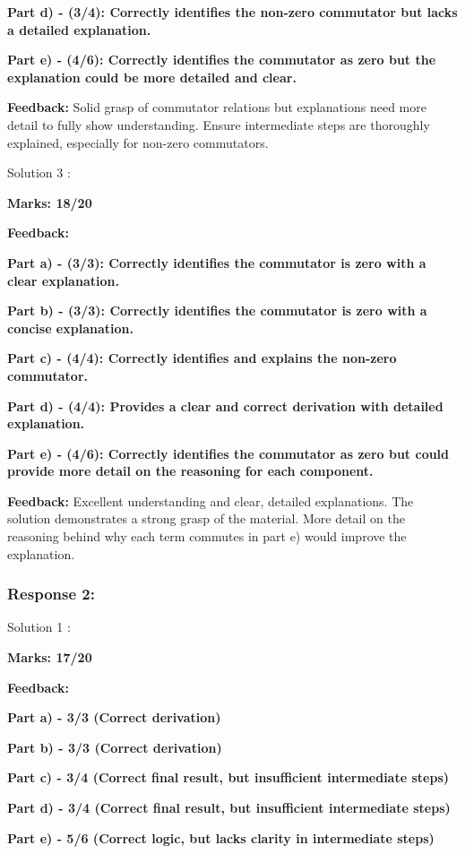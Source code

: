 \documentclass[a4paper,11pt]{article}
\begin{document}
\textbf{Part d) - (3/4): Correctly identifies the non-zero commutator but lacks a detailed explanation.}

\textbf{Part e) - (4/6): Correctly identifies the commutator as zero but the explanation could be more detailed and clear.}


\textbf{Feedback:}
Solid grasp of commutator relations but explanations need more detail to fully show understanding. Ensure intermediate steps are thoroughly explained, especially for non-zero commutators.


Solution 3 :

\textbf{Marks: 18/20}

\textbf{Feedback:}

\textbf{Part a) - (3/3): Correctly identifies the commutator is zero with a clear explanation.}

\textbf{Part b) - (3/3): Correctly identifies the commutator is zero with a concise explanation.}

\textbf{Part c) - (4/4): Correctly identifies and explains the non-zero commutator.}

\textbf{Part d) - (4/4): Provides a clear and correct derivation with detailed explanation.}

\textbf{Part e) - (4/6): Correctly identifies the commutator as zero but could provide more detail on the reasoning for each component.}


\textbf{Feedback:}
Excellent understanding and clear, detailed explanations. The solution demonstrates a strong grasp of the material. More detail on the reasoning behind why each term commutes in part e) would improve the explanation.


\subsubsection*{Response 2:}

Solution 1 :

\textbf{Marks: 17/20}

\textbf{Feedback:}

\textbf{Part a) - 3/3 (Correct derivation)}

\textbf{Part b) - 3/3 (Correct derivation)}

\textbf{Part c) - 3/4 (Correct final result, but insufficient intermediate steps)}

\textbf{Part d) - 3/4 (Correct final result, but insufficient intermediate steps)}

\textbf{Part e) - 5/6 (Correct logic, but lacks clarity in intermediate steps)}
\end{document}
